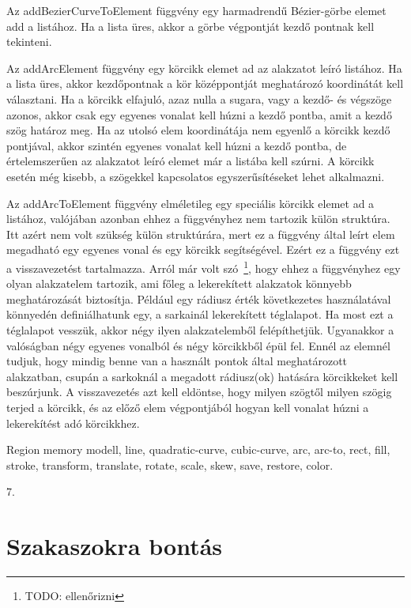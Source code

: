\documentclass[12pt]{report}
\theoremstyle{definition}
\newcommand{\func}[1]{{\textsf{\footnotesize{#1}}}}
\begin{document}
Az \func{addBezierCurveToElement} függvény egy harmadrendű
Bézier-görbe elemet add a listához. Ha a lista üres, akkor a görbe
végpontját kezdő pontnak kell tekinteni.

Az \func{addArcElement} függvény egy körcikk elemet ad az alakzatot leíró
listához. Ha a lista üres, akkor kezdőpontnak a kör középpontját meghatározó
koordinátát kell választani. Ha a körcikk elfajuló, azaz nulla a sugara, vagy a
kezdő- és végszöge azonos, akkor csak egy egyenes vonalat kell húzni a kezdő
pontba, amit a kezdő szög határoz meg. Ha az utolsó elem koordinátája nem
egyenlő a körcikk kezdő pontjával, akkor szintén egyenes vonalat kell
húzni a kezdő pontba, de értelemszerűen az alakzatot leíró elemet már a
listába kell szúrni. A körcikk esetén még kisebb, a szögekkel kapcsolatos
egyszerűsítéseket lehet alkalmazni.

Az \func{addArcToElement} függvény elméletileg egy speciális körcikk elemet ad
a listához, valójában azonban ehhez a függvényhez nem tartozik külön struktúra.
Itt azért nem volt szükség külön struktúrára, mert ez a függvény által leírt
elem megadható egy egyenes vonal és egy körcikk segítségével. Ezért ez a
függvény ezt a visszavezetést tartalmazza. Arról már volt szó~\footnote{TODO:
ellenőrizni}, hogy ehhez a függvényhez egy olyan alakzatelem tartozik, ami
főleg a lekerekített alakzatok könnyebb meghatározását biztosítja. Például egy
rádiusz érték következetes használatával könnyedén definiálhatunk egy, a
sarkainál lekerekített téglalapot. Ha most ezt a téglalapot vesszük, akkor négy
ilyen alakzatelemből felépíthetjük. Ugyanakkor a valóságban négy egyenes
vonalból és négy körcikkből épül fel. Ennél az elemnél tudjuk, hogy mindig
benne van a használt pontok által meghatározott alakzatban, csupán a sarkoknál
a megadott rádiusz(ok) hatására körcikkeket kell beszúrjunk. A visszavezetés
azt kell eldöntse, hogy milyen szögtől milyen szögig terjed a körcikk, és az
előző elem végpontjából hogyan kell vonalat húzni a lekerekítést adó
körcikkhez.

  \begin{description}[noitemsep]
    \item[Kulcsszavak] Region memory modell, line, quadratic-curve,
    cubic-curve, arc, arc-to, rect, fill, stroke, transform, translate, rotate,
    scale, skew, save, restore, color.
    \item[Becsült oldalszám] 7.
  \end{description}

  \section{Szakaszokra bontás}
\end{document}
